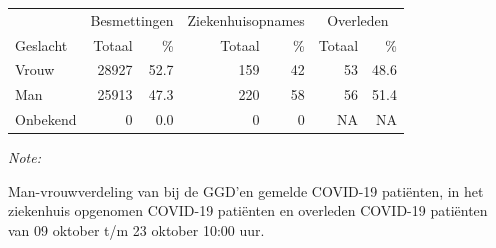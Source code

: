 \documentclass[
  english,
  man,floatsintext]{apa6}
\begin{document}
\begin{table}
\centering\begingroup\fontsize{11}{13}\selectfont

\begin{threeparttable}
\begin{tabular}{lrrrrrr}
\toprule
\multicolumn{1}{c}{ } & \multicolumn{2}{c}{Besmettingen} & \multicolumn{2}{c}{Ziekenhuisopnames} & \multicolumn{2}{c}{Overleden} \\
\cmidrule(l{3pt}r{3pt}){2-3} \cmidrule(l{3pt}r{3pt}){4-5} \cmidrule(l{3pt}r{3pt}){6-7}
Geslacht & Totaal & \% & Totaal & \% & Totaal & \%\\
\midrule
Vrouw & 28927 & 52.7 & 159 & 42 & 53 & 48.6\\
Man & 25913 & 47.3 & 220 & 58 & 56 & 51.4\\
Onbekend & 0 & 0.0 & 0 & 0 & NA & NA\\
\bottomrule
\end{tabular}
\begin{tablenotes}
\item \textit{Note: } 
\item Man-vrouwverdeling van bij de GGD’en gemelde COVID-19 patiënten, in het ziekenhuis opgenomen COVID-19 patiënten en overleden COVID-19 patiënten van 09 oktober t/m 23 oktober 10:00 uur.
\end{tablenotes}
\end{threeparttable}
\endgroup{}
\end{table}
\newpage
\end{document}
